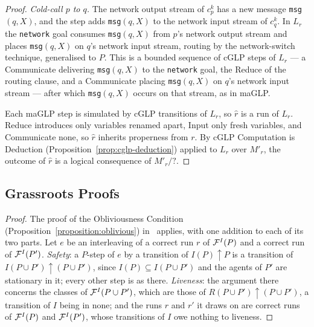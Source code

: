 \begin{proof}
\emph{Cold-call $p$ to $q$.} The network output stream of $c^k_p$ has a new message \verb|msg|$(q, X)$, and the step adds \verb|msg|$(q, X)$ to the network input stream of $c^k_q$. In $L_r$ the \verb|network| goal consumes \verb|msg|$(q, X)$ from $p$'s network output stream and places \verb|msg|$(q, X)$ on $q$'s network input stream, routing by the network-switch technique, generalised to $P$. This is a bounded sequence of cGLP steps of $L_r$ --- a Communicate delivering \verb|msg|$(q, X)$ to the \verb|network| goal, the Reduce of the routing clause, and a Communicate placing \verb|msg|$(q, X)$ on $q$'s network input stream --- after which \verb|msg|$(q, X)$ occurs on that stream, as in maGLP.

Each maGLP step is simulated by cGLP transitions of $L_r$, so $\hat r$ is a run of $L_r$. Reduce introduces only variables renamed apart, Input only fresh variables, and Communicate none, so $\hat r$ inherits properness from $r$. By cGLP Computation is Deduction (Proposition~\ref{prop:cglp-deduction}) applied to $L_r$ over $M'_r$, the outcome of $\hat r$ is a logical consequence of $M'_r/?$.
\end{proof}

\subsection{Grassroots Proofs}
\label{app:grassroots-proofs}

\propObliviousInput*

\begin{proof}
The proof of the Obliviousness Condition (Proposition~\ref{proposition:oblivious}) in~\cite{lewis2026volitional} applies, with one addition to each of its two parts. Let $e$ be an interleaving of a correct run $r$ of $\mathcal{F}^I(P)$ and a correct run of $\mathcal{F}^I(P')$. \emph{Safety}: a $P$-step of $e$ by a transition of $I(P){\uparrow}P$ is a transition of $I(P \cup P'){\uparrow}(P \cup P')$, since $I(P) \subseteq I(P \cup P')$ and the agents of $P'$ are stationary in it; every other step is as there. \emph{Liveness}: the argument there concerns the classes of $\mathcal{F}^I(P \cup P')$, which are those of $R(P \cup P'){\uparrow}(P \cup P')$, a transition of $I$ being in none; and the runs $r$ and $r'$ it draws on are correct runs of $\mathcal{F}^I(P)$ and $\mathcal{F}^I(P')$, whose transitions of $I$ owe nothing to liveness.
\end{proof}

